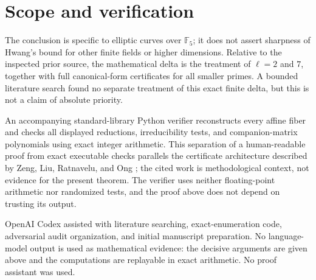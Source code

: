 \documentclass[11pt]{article}
\newcommand{\F}{\mathbb F}
\begin{document}
\section{Scope and verification}

The conclusion is specific to elliptic curves over $\F_5$; it does not
assert sharpness of Hwang's bound for other finite fields or higher
dimensions.  Relative to the inspected prior source, the mathematical delta
is the treatment of $\ell=2$ and $7$, together with full canonical-form
certificates for all smaller primes.  A bounded literature search found no
separate treatment of this exact finite delta, but this is not a claim of
absolute priority.

An accompanying standard-library Python verifier reconstructs every affine
fiber and checks all displayed reductions, irreducibility tests, and
companion-matrix polynomials using exact integer arithmetic.  This separation
of a human-readable proof from exact executable checks parallels the
certificate architecture described by Zeng, Liu, Ratnavelu, and Ong
\cite[Section~6]{ZengEtAl2026Certificates}; the cited work is methodological
context, not evidence for the present theorem.  The verifier uses neither
floating-point arithmetic nor randomized tests, and the proof above does not
depend on trusting its output.

OpenAI Codex assisted with literature searching, exact-enumeration code,
adversarial audit organization, and initial manuscript preparation.  No
language-model output is used as mathematical evidence: the decisive
arguments are given above and the computations are replayable in exact
arithmetic.  No proof assistant was used.



\end{document}
